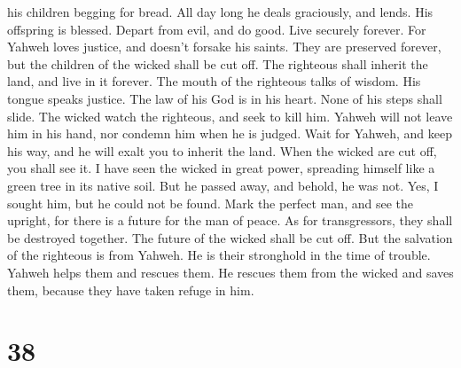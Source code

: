 his children begging for bread.  All day long he deals
graciously, and lends. His offspring is blessed.  Depart
from evil, and do good. Live securely forever.  For
Yahweh loves justice, and doesn't forsake his saints. They are preserved
forever, but the children of the wicked shall be cut off.
 The righteous shall inherit the land, and live in it
forever.  The mouth of the righteous talks of wisdom. His
tongue speaks justice.  The law of his God is in his
heart. None of his steps shall slide.  The wicked watch
the righteous, and seek to kill him.  Yahweh will not
leave him in his hand, nor condemn him when he is judged.
 Wait for Yahweh, and keep his way, and he will exalt you
to inherit the land. When the wicked are cut off, you shall see it.
 I have seen the wicked in great power, spreading himself
like a green tree in its native soil.  But he passed
away, and behold, he was not. Yes, I sought him, but he could not be
found.  Mark the perfect man, and see the upright, for
there is a future for the man of peace.  As for
transgressors, they shall be destroyed together. The future of the
wicked shall be cut off.  But the salvation of the
righteous is from Yahweh. He is their stronghold in the time of trouble.
 Yahweh helps them and rescues them. He rescues them from
the wicked and saves them, because they have taken refuge in him.

\hypertarget{section-37}{%
\section{38}\label{section-37}}

